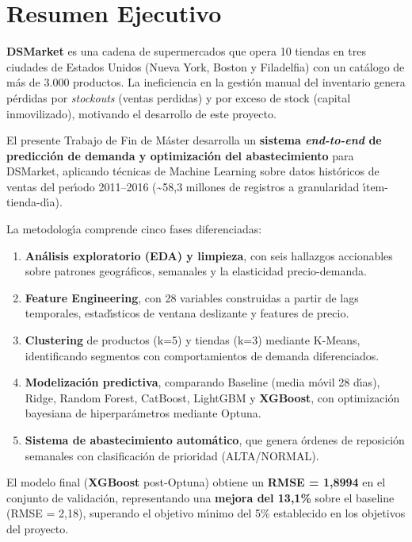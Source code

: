 \documentclass[12pt, a4paper, oneside]{report}
\newcommand{\kpi}[1]{\textbf{\color{accentorange}#1}}
\newcommand{\model}[1]{\textbf{\color{nucliolight}#1}}
\newcommand{\metric}[1]{\textbf{\color{accentorange}#1}}
\begin{document}
\chapter*{Resumen Ejecutivo}

\textbf{DSMarket} es una cadena de supermercados que opera 10 tiendas en tres ciudades de Estados Unidos (Nueva York, Boston y Filadelfia) con un cat\'alogo de m\'as de 3.000 productos. La ineficiencia en la gesti\'on manual del inventario genera p\'erdidas por \textit{stockouts} (ventas perdidas) y por exceso de stock (capital inmovilizado), motivando el desarrollo de este proyecto.

El presente Trabajo de Fin de M\'aster desarrolla un \textbf{sistema \textit{end-to-end} de predicci\'on de demanda y optimizaci\'on del abastecimiento} para DSMarket, aplicando t\'ecnicas de Machine Learning sobre datos hist\'oricos de ventas del per\'{\i}odo 2011--2016 (\textasciitilde58,3 millones de registros a granularidad \'{\i}tem-tienda-d\'{\i}a).

La metodolog\'{\i}a comprende cinco fases diferenciadas:

\begin{enumerate}[leftmargin=*, noitemsep]
  \item \textbf{An\'alisis exploratorio (EDA) y limpieza}, con seis hallazgos accionables sobre patrones geogr\'aficos, semanales y la elasticidad precio-demanda.
  \item \textbf{Feature Engineering}, con 28 variables construidas a partir de lags temporales, estad\'{\i}sticos de ventana deslizante y features de precio.
  \item \textbf{Clustering} de productos (k=5) y tiendas (k=3) mediante K-Means, identificando segmentos con comportamientos de demanda diferenciados.
  \item \textbf{Modelizaci\'on predictiva}, comparando Baseline (media m\'ovil 28 d\'{\i}as), Ridge, Random Forest, CatBoost, LightGBM y \model{XGBoost}, con optimizaci\'on bayesiana de hiperpar\'ametros mediante Optuna.
  \item \textbf{Sistema de abastecimiento autom\'atico}, que genera \'ordenes de reposici\'on semanales con clasificaci\'on de prioridad (ALTA/NORMAL).
\end{enumerate}

El modelo final (\model{XGBoost} post-Optuna) obtiene un \metric{RMSE = 1,8994} en el conjunto de validaci\'on, representando una \kpi{mejora del 13,1\%} sobre el baseline (RMSE = 2,18), superando el objetivo m\'{\i}nimo del 5\% establecido en los objetivos del proyecto.
\end{document}
